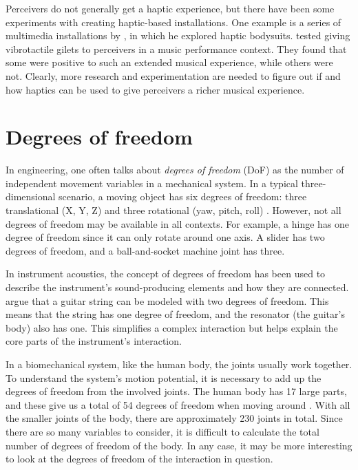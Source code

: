 Perceivers do not generally get a haptic experience, but there have been some experiments with creating haptic-based installations. One example is a series of multimedia installations by \citet{stenslie_virtual_2011}, in which he explored haptic bodysuits. \citet{turchet_smart_2019} tested giving vibrotactile gilets to perceivers in a music performance context. They found that some were positive to such an extended musical experience, while others were not. Clearly, more research and experimentation are needed to figure out if and how haptics can be used to give perceivers a richer musical experience.


\section{Degrees of freedom}\label{sec:dof}

In engineering, one often talks about \emph{degrees of freedom} (DoF) as the number of independent movement variables in a mechanical system. In a typical three-dimensional scenario, a moving object has six degrees of freedom: three translational (X, Y, Z) and three rotational (yaw, pitch, roll) \citep{huston_principles_2008}. However, not all degrees of freedom may be available in all contexts. For example, a hinge has one degree of freedom since it can only rotate around one axis. A slider has two degrees of freedom, and a ball-and-socket machine joint has three.

In instrument acoustics, the concept of degrees of freedom has been used to describe the instrument's sound-producing elements and how they are connected. \citet{chaigne_acoustics_2016} argue that a guitar string can be modeled with two degrees of freedom. This means that the string has one degree of freedom, and the resonator (the guitar's body) also has one. This simplifies a complex interaction but helps explain the core parts of the instrument's interaction.

In a biomechanical system, like the human body, the joints usually work together. To understand the system's motion potential, it is necessary to add up the degrees of freedom from the involved joints. The human body has 17 large parts, and these give us a total of 54 degrees of freedom when moving around \citep{huston_principles_2008}. With all the smaller joints of the body, there are approximately 230 joints in total. Since there are so many variables to consider, it is difficult to calculate the total number of degrees of freedom of the body. In any case, it may be more interesting to look at the degrees of freedom of the interaction in question.

